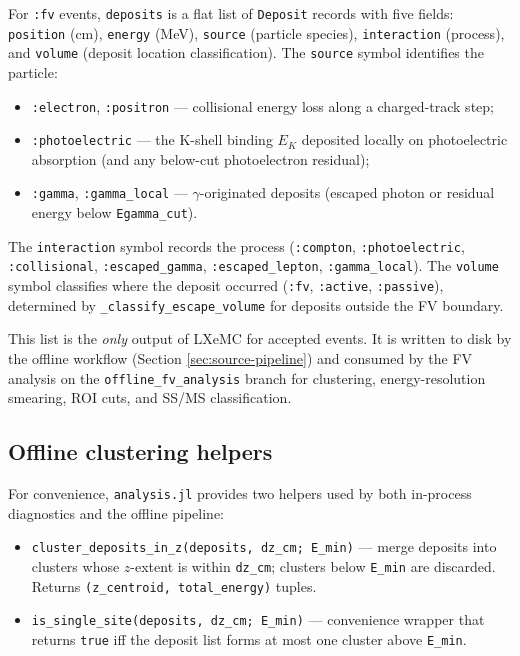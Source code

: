 \documentclass[11pt]{article}
\begin{document}
For \texttt{:fv} events, \texttt{deposits} is a flat list of
\texttt{Deposit} records with five fields: \texttt{position} (cm),
\texttt{energy} (MeV), \texttt{source} (particle species),
\texttt{interaction} (process), and \texttt{volume} (deposit location
classification). The \texttt{source} symbol identifies the particle:
\begin{itemize}
\item \texttt{:electron}, \texttt{:positron} --- collisional energy loss
along a charged-track step;
\item \texttt{:photoelectric} --- the K-shell binding $E_K$ deposited
locally on photoelectric absorption (and any below-cut photoelectron
residual);
\item \texttt{:gamma}, \texttt{:gamma\_local} --- $\gamma$-originated
deposits (escaped photon or residual energy below \texttt{Egamma\_cut}).
\end{itemize}
The \texttt{interaction} symbol records the process (\texttt{:compton},
\texttt{:photoelectric}, \texttt{:collisional}, \texttt{:escaped\_gamma},
\texttt{:escaped\_lepton}, \texttt{:gamma\_local}). The \texttt{volume}
symbol classifies where the deposit occurred (\texttt{:fv},
\texttt{:active}, \texttt{:passive}), determined by
\texttt{\_classify\_escape\_volume} for deposits outside the FV boundary.

This list is the \emph{only} output of LXeMC for accepted events. It is
written to disk by the offline workflow (Section \ref{sec:source-pipeline})
and consumed by the FV analysis on the \texttt{offline\_fv\_analysis} branch
for clustering, energy-resolution smearing, ROI cuts, and SS/MS
classification.

\subsection{Offline clustering helpers}
\label{sec:event-clustering}

For convenience, \texttt{analysis.jl} provides two helpers used by both
in-process diagnostics and the offline pipeline:

\begin{itemize}
\item \texttt{cluster\_deposits\_in\_z(deposits, dz\_cm; E\_min)} --- merge
deposits into clusters whose $z$-extent is within \texttt{dz\_cm}; clusters
below \texttt{E\_min} are discarded. Returns
\texttt{(z\_centroid, total\_energy)} tuples.
\item \texttt{is\_single\_site(deposits, dz\_cm; E\_min)} --- convenience
wrapper that returns \texttt{true} iff the deposit list forms at most one
cluster above \texttt{E\_min}.
\end{itemize}
\end{document}
